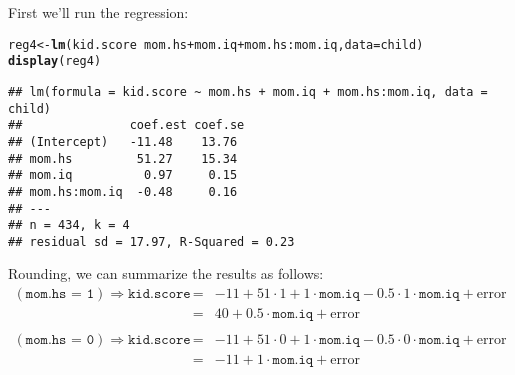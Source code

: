 \documentclass[12pt]{article}\usepackage[]{graphicx}\usepackage[]{color}
\makeatletter
\newcommand{\hlopt}[1]{\textcolor[rgb]{0,0,0}{#1}}%
\newcommand{\hlstd}[1]{\textcolor[rgb]{0.345,0.345,0.345}{#1}}%
\newcommand{\hlkwb}[1]{\textcolor[rgb]{0.69,0.353,0.396}{#1}}%
\newcommand{\hlkwc}[1]{\textcolor[rgb]{0.333,0.667,0.333}{#1}}%
\newcommand{\hlkwd}[1]{\textcolor[rgb]{0.737,0.353,0.396}{\textbf{#1}}}%
\newenvironment{kframe}{%
 \def\at@end@of@kframe{}%
 \ifinner\ifhmode%
  \def\at@end@of@kframe{\end{minipage}}%
  \begin{minipage}{\columnwidth}%
 \fi\fi%
 \def\FrameCommand##1{\hskip\@totalleftmargin \hskip-\fboxsep
 \colorbox{shadecolor}{##1}\hskip-\fboxsep
     \hskip-\linewidth \hskip-\@totalleftmargin \hskip\columnwidth}%
 \MakeFramed {\advance\hsize-\width
   \@totalleftmargin\z@ \linewidth\hsize
   \@setminipage}}%
 {\par\unskip\endMakeFramed%
 \at@end@of@kframe}
\newenvironment{knitrout}{}{} %
\makeatother
\begin{document}
First we'll run the regression:
\begin{knitrout}
\color{fgcolor}\begin{kframe}
\begin{alltt}
\hlstd{reg4} \hlkwb{<-} \hlkwd{lm}\hlstd{(kid.score} \hlopt{~} \hlstd{mom.hs} \hlopt{+} \hlstd{mom.iq} \hlopt{+} \hlstd{mom.hs}\hlopt{:}\hlstd{mom.iq,} \hlkwc{data} \hlstd{= child)}
\hlkwd{display}\hlstd{(reg4)}
\end{alltt}
\begin{verbatim}
## lm(formula = kid.score ~ mom.hs + mom.iq + mom.hs:mom.iq, data = child)
##               coef.est coef.se
## (Intercept)   -11.48    13.76 
## mom.hs         51.27    15.34 
## mom.iq          0.97     0.15 
## mom.hs:mom.iq  -0.48     0.16 
## ---
## n = 434, k = 4
## residual sd = 17.97, R-Squared = 0.23
\end{verbatim}
\end{kframe}
\end{knitrout}
Rounding, we can summarize the results as follows:
  \begin{eqnarray*}
    (\texttt{mom.hs = 1})\Rightarrow \texttt{kid.score} &=& -11 + 51 \cdot 1 + 1\cdot \texttt{mom.iq} -0.5\cdot 1 \cdot \texttt{mom.iq} +\mbox{error}\\
      &=& 40 + 0.5\cdot \texttt{mom.iq} + \mbox{error}\\ \\
    (\texttt{mom.hs = 0})\Rightarrow \texttt{kid.score} &=& -11 + 51 \cdot 0 + 1\cdot \texttt{mom.iq} -0.5\cdot 0 \cdot \texttt{mom.iq} +\mbox{error}\\
      &=&-11 + 1\cdot \texttt{mom.iq} + \mbox{error}
  \end{eqnarray*}
\end{document}
